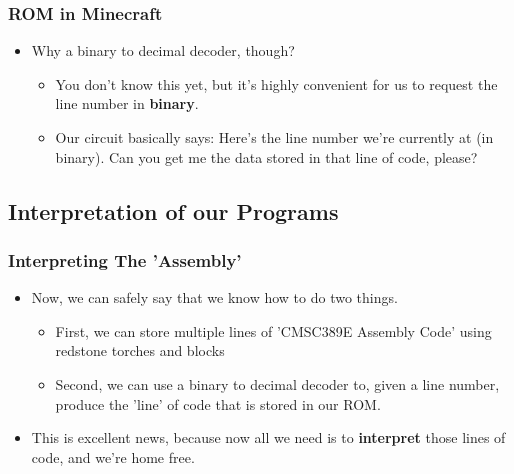 \documentclass{beamer}
\begin{document}
             \begin{frame}
             	\frametitle{ROM in Minecraft}
             	\begin{itemize}
             		\item Why a binary to decimal decoder, though?
             		\begin{itemize}
             			\item You don't know this yet, but it's highly convenient for us to request the line number in \textbf{binary}.
             			\item Our circuit basically says: Here's the line number we're currently at (in binary). Can you get me the data stored in that line of code, please?
             		\end{itemize}
             	\end{itemize}
             \end{frame}
             
             
		\subsection{Interpretation of our Programs}
			
			\begin{frame}
				\frametitle{Interpreting The 'Assembly'}
				\begin{itemize}
					\item Now, we can safely say that we know how to do two things.
					\begin{itemize}
						\item First, we can store multiple lines of 'CMSC389E Assembly Code' using redstone torches and blocks
						\item Second, we can use a binary to decimal decoder to, given a line number, produce the 'line' of code that is stored in our ROM.
					\end{itemize}
					\item This is excellent news, because now all we need is to \textbf{interpret} those lines of code, and we're home free.
				\end{itemize}
			\end{frame}
			
\end{document}
